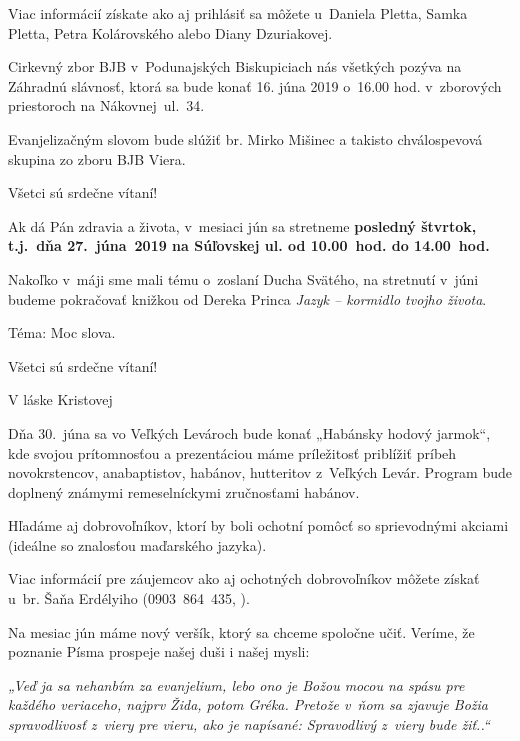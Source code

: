 Viac informácií získate ako aj prihlásiť sa môžete u~Daniela Pletta, Samka Pletta, Petra Kolárovského alebo Diany Dzuriakovej.


Cirkevný zbor BJB v~Podunajských Biskupiciach nás všetkých pozýva na Záhradnú slávnosť, ktorá sa bude konať 16. júna 2019 o~16.00 hod. v~zborových priestoroch na Nákovnej~ul.~34.

Evanjelizačným slovom bude slúžiť br. Mirko Mišinec a takisto chválospevová skupina zo zboru BJB Viera.

Všetci sú srdečne vítaní!


Ak dá Pán zdravia a života, v~mesiaci jún sa stretneme {\bf posledný štvrtok, t.j.~dňa 27.~júna~2019 na Súľovskej ul. od 10.00~hod. do 14.00~hod.}

Nakoľko v~máji sme mali tému o~zoslaní Ducha Svätého, na stretnutí v~júni budeme pokračovať knižkou od Dereka Princa {\it Jazyk -- kormidlo tvojho života}.

Téma: Moc slova.

Všetci sú srdečne vítaní!

V láske Kristovej

\vfill\break


Dňa 30.~júna sa vo Veľkých Levároch bude konať „Habánsky hodový jarmok“, kde svojou prítomnosťou a prezentáciou máme príležitosť priblížiť príbeh novokrstencov, anabaptistov, habánov, hutteritov z~Veľkých Levár. Program bude doplnený známymi remeselníckymi zručnosťami habánov.

Hľadáme aj dobrovoľníkov, ktorí by boli ochotní pomôcť so sprievodnými akciami (ideálne so znalosťou maďarského jazyka).

Viac informácií pre záujemcov ako aj ochotných dobrovoľníkov môžete získať u~br. Šaňa Erdélyiho (0903~864~435, ).



Na mesiac jún máme nový veršík, ktorý sa chceme spoločne učiť. Veríme, že poznanie Písma prospeje našej duši i našej mysli:

{\it „Veď ja sa nehanbím za evanjelium, lebo ono je Božou mocou na spásu pre každého veriaceho, najprv Žida, potom Gréka. Pretože v~ňom sa zjavuje Božia spravodlivosť z~viery pre vieru, ako je napísané: Spravodlivý z~viery bude žiť..“}

